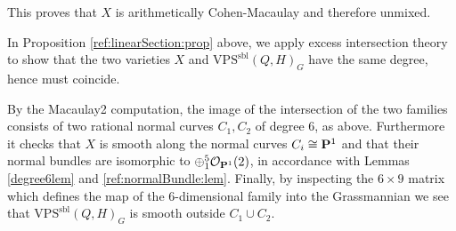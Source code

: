 \documentclass{amsart}
\newcommand{\PP}{{\bf P}}
\newcommand{\OO}{{\mathcal{O}}}
\newcommand{\VPSsbl}{{\mathrm{VPS}}^{\mathrm{sbl}}(Q, H)}
\begin{document}
This proves that $X$ is arithmetically Cohen-Macaulay and therefore unmixed.

In Proposition \ref{ref:linearSection:prop} above, we apply excess intersection theory to show that the two varieties $X$ and $\VPSsbl_G$ have the same degree, hence must coincide.

By the Macaulay2 computation, the image of the intersection of the two families consists of two rational normal curves $C_1,C_2$ of degree $6$, as above.  Furthermore it checks that $X$ is smooth along the normal curves $C_i \cong \PP^1$ and  that 
their normal bundles are isomorphic to $\oplus^5_{1} \OO_{\PP^1}(2)$, in accordance with Lemmas \ref{degree6lem} and \ref{ref:normalBundle:lem}.
Finally, by inspecting the $6 \times 9$ matrix which defines the map of the 6-dimensional family into the Grassmannian we see that $\VPSsbl_G$ is smooth outside $C_1 \cup C_2$.
\end{document}
